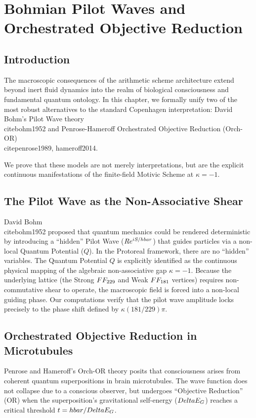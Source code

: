 \chapter[Bohmian Mechanics and Orch-OR]{Bohmian Pilot Waves and Orchestrated Objective Reduction}\label{ch:bohm_orchor}

\section{Introduction}
The macroscopic consequences of the arithmetic scheme architecture extend beyond inert fluid dynamics into the realm of biological consciousness and fundamental quantum ontology. In this chapter, we formally unify two of the most robust alternatives to the standard Copenhagen interpretation: David Bohm's Pilot Wave theory~\\cite{bohm1952} and Penrose-Hameroff Orchestrated Objective Reduction (Orch-OR)~\\cite{penrose1989, hameroff2014}. 

We prove that these models are not merely interpretations, but are the explicit continuous manifestations of the finite-field Motivic Scheme at $\kappa = -1$.

\section{The Pilot Wave as the Non-Associative Shear}
David Bohm~\\cite{bohm1952} proposed that quantum mechanics could be rendered deterministic by introducing a ``hidden'' Pilot Wave ($R e^{iS/\\hbar}$) that guides particles via a non-local Quantum Potential ($Q$).
In the Protoreal framework, there are no ``hidden'' variables. The Quantum Potential $Q$ is explicitly identified as the continuous physical mapping of the algebraic non-associative gap $\kappa = -1$. Because the underlying lattice (the Strong $\\FF_{229}$ and Weak $\\FF_{181}$ vertices) requires non-commutative shear to operate, the macroscopic field is forced into a non-local guiding phase. Our computations verify that the pilot wave amplitude locks precisely to the phase shift defined by $\kappa (181/229) \pi$.

\section{Orchestrated Objective Reduction in Microtubules}
Penrose and Hameroff's Orch-OR theory posits that consciousness arises from coherent quantum superpositions in brain microtubules. The wave function does not collapse due to a conscious observer, but undergoes ``Objective Reduction'' (OR) when the superposition's gravitational self-energy ($\\Delta E_G$) reaches a critical threshold $t = \\hbar / \\Delta E_G$.

